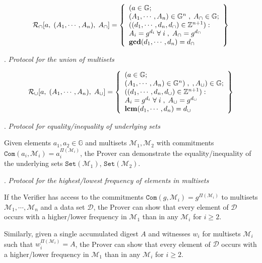 \documentclass[11pt, lettersize, notitlepage, leqno, footskip=0.6cm]{article}
\newcommand{\bz}{\mathbb Z}
\newcommand{\ttt}{\texttt}
\newcommand{\bG}{\mathbb{G}}
\newcommand{\sett}{\ttt{Set}}
\newcommand{\mc}{\mathcal}
\newcommand{\mb}{\mathbb}
\newcommand{\mbf}{\mathbf}
\newcommand{\mcM}{\mc{M}}
\newcommand{\noin}{\noindent}
\newcommand{\LCM}{\mbf{lcm}}
\newcommand{\GCD}{\mbf{gcd}}
\numberwithin{equation}{section}
\begin{document}
{\[
  \mc{R}_{\tt{\cap}}[a,\; (A_1,\cdots,A_n),\; A_{\tt{\cap}}] = \left\{\begin{array}{l}
    (a\in\mb{G};\;\\
     (A_1,\cdots,A_n)\in\mb{G}^{n}\;,\; A_{\tt{\cap}}\in\bG;\\
    ((d_1,\cdots,d_n, d_{\tt{\cap}})\in\bz^{n+1}): \\
    A_i = g^{d_i}\;\forall\;i\;,\; A_{\tt{\cap}} = g^{d_{\tt{\cap}}}   \\
    
  \GCD(d_1, \cdots, d_n) = d_{\tt{\cap}}
  \end{array}\right\}
\] 

\noin 15. \textit{Protocol for the union of multisets }\vspace{-0.3 cm}

\[
  \mc{R}_{\tt{\cup}}[a,\; (A_1,\cdots,A_n),\; A_{\tt{\cup}}] = \left\{\begin{array}{l}
    (a\in\mb{G};\;\\
     (A_1,\cdots,A_n)\in \mb{G}^{n})\;,\;,A_{\tt{\cup}})\in\mb{G};\\
    ((d_1,\cdots,d_n, d_{\tt{\cup}})\in\bz^{n+1}): \\
    A_i = g^{d_i}\;\forall\;i\;,\; A_{\tt{\cup}} = g^{d_{\tt{\cup}}}   \\
    
  \LCM(d_1, \cdots, d_n) = d_{\tt{\cup}}
  \end{array}\right\}
\] 

\noin 16. \textit{Protocol for equality/inequality of underlying sets} \vspace{0.1cm}

\noin Given elements $a_1,a_2\in\bG$ and multisets $\mcM_1, \mcM_2$ with commitments $\ttt{Com}(a_i, \mcM_i) = a_i^{\Pi(\mcM_i)}$, the Prover can demonstrate the equality/inequality of the underlying sets $\sett(\mcM_1)$, $\sett(\mcM_2)$.\vspace{0.25cm}

\noin 17. \textit{Protocol for the highest/lowest frequency of elements in multisets} \vspace{0.1cm}

\noin If the Verifier has access to the commitments $\ttt{Com}(g, \mcM_i)= g^{\Pi(\mcM_i)}$ to multisets $\mcM_1,\cdots,\mcM_n$ and a data set $\mc{D}$, the Prover can show that every element of $\mc{D}$ occurs with a higher/lower frequency in $\mcM_1$ than in any $\mcM_i$ for $i\geq 2$.

\noin Similarly, given a single accumulated digest $A$ and witnesses $w_i$ for multisets $\mcM_i$ such that $w_i^{\Pi(\mcM_i)} = A $, the Prover can show that every element of $\mc{D}$ occurs with a higher/lower frequency in $\mcM_1$ than in any $\mcM_i$ for $i\geq 2$.\vspace{0.25cm}

}
\end{document}
